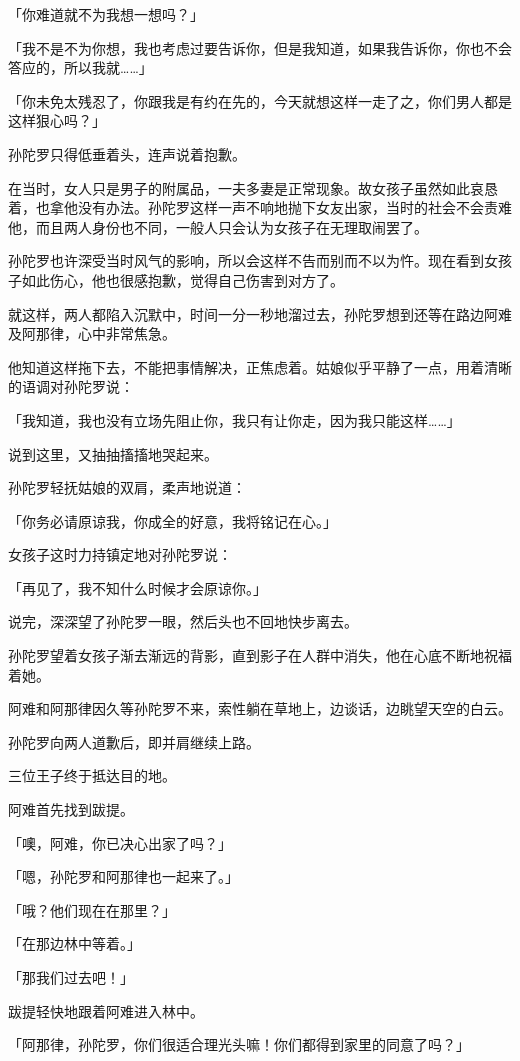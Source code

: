 \documentclass[twoside,openany]{book}
\begin{document}
「你难道就不为我想一想吗？」

「我不是不为你想，我也考虑过要告诉你，但是我知道，如果我告诉你，你也不会答应的，所以我就……」

「你未免太残忍了，你跟我是有约在先的，今天就想这样一走了之，你们男人都是这样狠心吗？」

孙陀罗只得低垂着头，连声说着抱歉。

在当时，女人只是男子的附属品，一夫多妻是正常现象。故女孩子虽然如此哀恳着，也拿他没有办法。孙陀罗这样一声不响地抛下女友出家，当时的社会不会责难他，而且两人身份也不同，一般人只会认为女孩子在无理取闹罢了。

孙陀罗也许深受当时风气的影响，所以会这样不告而别而不以为忤。现在看到女孩子如此伤心，他也很感抱歉，觉得自己伤害到对方了。

就这样，两人都陷入沉默中，时间一分一秒地溜过去，孙陀罗想到还等在路边阿难及阿那律，心中非常焦急。

他知道这样拖下去，不能把事情解决，正焦虑着。姑娘似乎平静了一点，用着清晰的语调对孙陀罗说：

「我知道，我也没有立场先阻止你，我只有让你走，因为我只能这样……」

说到这里，又抽抽搐搐地哭起来。

孙陀罗轻抚姑娘的双肩，柔声地说道：

「你务必请原谅我，你成全的好意，我将铭记在心。」

女孩子这时力持镇定地对孙陀罗说：

「再见了，我不知什么时候才会原谅你。」

说完，深深望了孙陀罗一眼，然后头也不回地快步离去。

孙陀罗望着女孩子渐去渐远的背影，直到影子在人群中消失，他在心底不断地祝福着她。

阿难和阿那律因久等孙陀罗不来，索性躺在草地上，边谈话，边眺望天空的白云。

孙陀罗向两人道歉后，即并肩继续上路。

三位王子终于抵达目的地。

阿难首先找到跋提。

「噢，阿难，你已决心出家了吗？」

「嗯，孙陀罗和阿那律也一起来了。」

「哦？他们现在在那里？」

「在那边林中等着。」

「那我们过去吧！」

跋提轻快地跟着阿难进入林中。

「阿那律，孙陀罗，你们很适合理光头嘛！你们都得到家里的同意了吗？」
\end{document}
